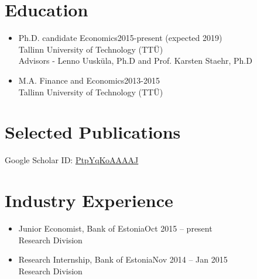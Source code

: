 \documentclass[11pt,letter,sans]{moderncv}
\begin{document}
\hypersetup{linkcolor=color0,urlcolor=color1}
\makecvtitle

\vspace{-7mm}
\section{Education}
\begin{itemize}\item Ph.D. candidate Economics\hfill 2015-present (expected 2019) \\
     Tallinn University of Technology (TTÜ) \\
   Advisors - Lenno Uusküla, Ph.D and Prof. Karsten Staehr, Ph.D
\item M.A. Finance and Economics\hfill 2013-2015 \\
     Tallinn University of Technology (TTÜ) \\
\end{itemize}


\section{Selected Publications}
\vspace{-7mm}
\hfill
Google Scholar ID:
\href{https://scholar.google.com/citations?user=PtpYqKoAAAAJ}{PtpYqKoAAAAJ}
\vspace{2mm}

\renewcommand*{\bibfont}{\small}

\begin{refsection}
\nocite{*}
\printbibliography[heading=none,prefixnumbers=]
\end{refsection}


\section{Industry Experience}
  \begin{itemize}
      \item Junior Economist, Bank of Estonia\hfill Oct 2015 -- present \\
        Research Division

      \item Research Internship, Bank of Estonia\hfill Nov 2014 -- Jan 2015 \\
        Research Division

  \end{itemize}
\end{document}
